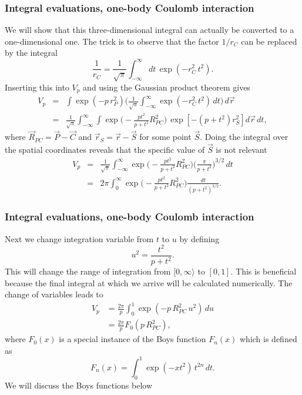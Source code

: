 \frame
{
  \frametitle{Integral evaluations, one-body Coulomb interaction}
\begin{small}
{\scriptsize
We will show that this three-dimensional integral can actually be converted to a one-dimensional one. The trick is to observe that the factor $1/r_C$ can be replaced by the integral
\begin{equation}
 \frac{1}{r_C} = \frac{1}{\sqrt{\pi}}\int_{-\infty}^\infty dt\,\exp(-r^2_C\,t^2).
\end{equation}
Inserting this into $V_p$ and using the Gaussian product theorem gives
\begin{eqnarray}
 V_p & = & \int \exp(-p\,r_P^2)\Big(\frac{1}{\sqrt{\pi}}\int_{-\infty}^\infty\exp(-r^2_C\,t^2)\,dt\Big)\,d\vec r \\
     & = & \frac{1}{\sqrt{\pi}}\int_{-\infty}^\infty\int\exp\Big(-\frac{pt^2}{p + t^2}R^2_{PC}\Big)\,\exp[-(p + t^2)r^2_S] d\vec r\, dt,
\end{eqnarray}
where $\vec R_{PC} = \vec P - \vec C$ and $\vec r_S = \vec r - \vec S$ for some point $\vec S$. Doing the integral over the spatial coordinates reveals that the specific value of $\vec S$ is not relevant
\begin{eqnarray}
 V_p & = & \frac{1}{\sqrt{\pi}}\int_{-\infty}^\infty\exp\Big(-\frac{pt^2}{p + t^2}R^2_{PC}\Big)\Big(\frac{\pi}{p + t^2}\Big)^{3/2}\,dt \\
     & = & 2\pi\int_0^\infty\exp\Big(-\frac{pt^2}{p + t^2}R^2_{PC}\Big)\frac{dt}{(p + t^2)^{3/2}}.
\end{eqnarray}
}
\end{small}
}
\frame
{
  \frametitle{Integral evaluations, one-body Coulomb interaction}
\begin{small}
{\scriptsize
Next we change integration variable from $t$ to $u$ by defining
\begin{equation}
 u^2 = \frac{t^2}{p + t^2}.
\end{equation}
This will change the range of integration from $[0,\infty\rangle$ to $[0,1]$. This is beneficial because the final integral at which we arrive will be calculated numerically.
The change of variables leads to
\begin{align}
\label{eq:V_p}
 V_p & = \frac{2\pi}{p}\int_0^1\exp(-p\,R^2_{PC}\,u^2)\,du \\
     & = \frac{2\pi}{p}F_0(p\,R^2_{PC}),
\end{align}
where $F_0(x)$ is a special instance of the Boys function $F_n(x)$ which is defined as
\begin{equation}
 F_n(x) = \int_0^1\exp(-xt^2)\,t^{2n}\,dt.
\end{equation}
We will discuss the Boys functions below
}
\end{small}
}





